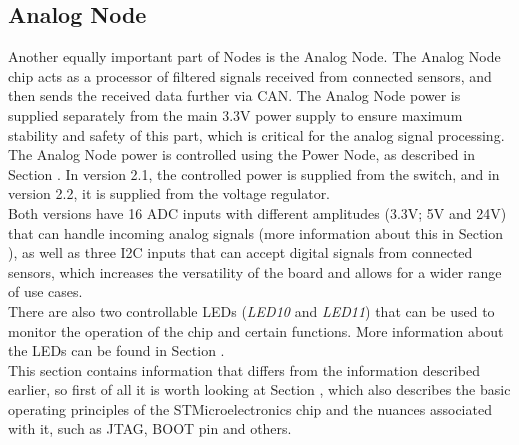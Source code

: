 \documentclass[10pt]{datasheet}
\begin{document}
\subsection{Analog Node}
\label{ssec:analog_node}
Another equally important part of Nodes is the Analog Node. The Analog Node chip acts as a processor of filtered signals received from connected sensors, and then sends the received data further via CAN.
The Analog Node power is supplied separately from the main 3.3V power supply to ensure maximum stability and safety of this part, which is critical for the analog signal processing. The Analog Node power is controlled using the Power Node, as described in Section . In version 2.1, the controlled power is supplied from the switch, and in version 2.2, it is supplied from the voltage regulator. \\
Both versions have 16 ADC inputs with different amplitudes (3.3V; 5V and 24V) that can handle incoming analog signals (more information about this in Section ), as well as three I2C inputs that can accept digital signals from connected sensors, which increases the versatility of the board and allows for a wider range of use cases. \\
There are also two controllable LEDs (\textit{LED10} and \textit{LED11}) that can be used to monitor the operation of the chip and certain functions. More information about the LEDs can be found in Section . \\
This section contains information that differs from the information described earlier, so first of all it is worth looking at Section , which also describes the basic operating principles of the STMicroelectronics chip and the nuances associated with it, such as JTAG, BOOT pin and others.
\end{document}
